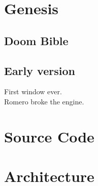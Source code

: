 \section{Genesis}
\subsection{Doom Bible}
\subsection{Early version}
First window ever.\\
Romero broke the engine.\\

\section{Source Code}

\section{Architecture}
